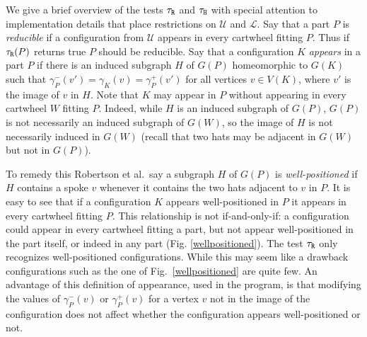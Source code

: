 \documentclass[11pt]{article}
\newcommand{\mcal}{\mathcal}
\newcommand{\gm}{\gamma}
\begin{document}
We give a brief overview of the tests $\tau_{\tt R}$ and $\tau_{\tt H}$ with special attention to implementation details that place restrictions on $\mcal{U}$ and $\mcal{L}$. Say that a part $P$ is \emph{reducible} if a configuration from $\mcal{U}$ appears in every cartwheel fitting $P$. Thus if $\tau_{\tt R}(P)$ returns true $P$ should be reducible. Say that a configuration $K$ \emph{appears} in a part $P$ if there is an induced subgraph $H$ of $G(P)$ homeomorphic to $G(K)$ such that $\gm_P^-(v') = \gm_K(v) = \gm_P^+(v')$ for all vertices $v \in V(K)$, where $v'$ is the image of $v$ in $H$. Note that $K$ may appear in $P$ without appearing in every cartwheel $W$ fitting $P$. Indeed, while $H$ is an induced subgraph of $G(P)$, $G(P)$ is not necessarily an induced subgraph of $G(W)$, so the image of $H$ is not necessarily induced in $G(W)$ (recall that two hats may be adjacent in $G(W)$ but not in $G(P)$). 

\wellpositionedfig

To remedy this Robertson et al.~say a subgraph $H$ of $G(P)$ is \emph{well-positioned} if 
$H$ contains a spoke $v$ whenever it contains the two hats adjacent to $v$ in $P$. It is easy to see that if a configuration $K$ appears well-positioned in $P$ it appears in every cartwheel fitting $P$. This relationship is not if-and-only-if: a configuration could appear in every cartwheel fitting a part, but not appear well-positioned in the part itself, or indeed in any part (Fig$.$ \ref{wellpositioned}). The test $\tau_{\tt R}$ only recognizes well-positioned configurations. While this may seem like a drawback configurations such as the one of Fig$.$~\ref{wellpositioned} are quite few. An advantage of this definition of appearance, used in the program, is that modifying the values of $\gamma_P^-(v)$ or $\gamma_P^+(v)$ for a vertex $v$ not in the image of the configuration does not affect whether the configuration appears well-positioned or not. 

\spanningtreefig
\bigradiusesfig
\end{document}
